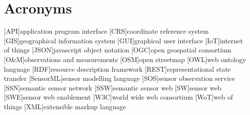 
\chapter*{Acronyms}

\begin{acronym}[UML]
  [API]{application program interface}
  [CRS]{coordinate reference system} 
  [GIS]{geographical information system}
  [GUI]{graphical user interface}
  [IoT]{internet of things}
  [JSON]{javascript object notation}
  [OGC]{open geospatial consortium}
  [O\&M]{observations and measurements}
  [OSM]{open streetmap}
  [OWL]{web ontology language}
  [RDF]{resource description framework}
  [REST]{representational state transfer}
  [SensorML]{sensor modelling language}
  [SOS]{sensor observation service}
  [SSN]{semantic sensor network}
  [SSW]{semantic sensor web}
  [SW]{sensor web}
  [SWE]{sensor web enablement}
  [W3C]{world wide web consortium}
  [WoT]{web of things}
  [XML]{extensible markup language}
\end{acronym}